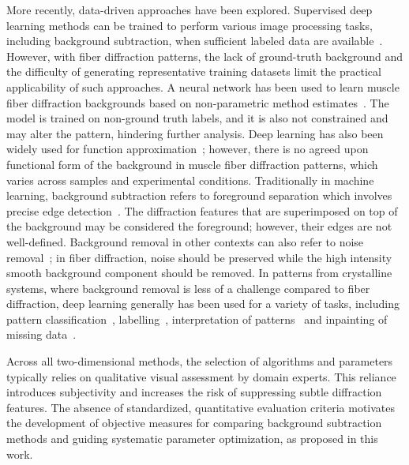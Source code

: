 \documentclass[iucr]{iucrjournals}
\begin{document}
More recently, data-driven approaches have been explored. Supervised deep learning methods can be trained to perform various image processing tasks, including background subtraction, when sufficient labeled data are available~\cite{archana2024dl_image_processing_review}. However, with fiber diffraction patterns, the lack of ground-truth background and the difficulty of generating representative training datasets limit the practical applicability of such approaches. A neural network has been used to learn muscle fiber diffraction backgrounds based on non-parametric method estimates~\cite{ArangurenCarmona2020}. The model is trained on non-ground truth labels, and it is also not constrained and may alter the pattern, hindering further analysis. Deep learning has also been widely used for function approximation~\cite{devore2021nn_approximation}; however, there is no agreed upon functional form of the background in muscle fiber diffraction patterns, which varies across samples and experimental conditions. Traditionally in machine learning, background subtraction refers to foreground separation which involves precise edge detection~\cite{bouwmans2019dnn_background_subtraction}. The diffraction features that are superimposed on top of the background may be considered the foreground; however, their edges are not well-defined. Background removal in other contexts can also refer to noise removal~\cite{jiang2025efficient_denoising_survey}; in fiber diffraction, noise should be preserved while the high intensity smooth background component should be removed.  In patterns from crystalline systems, where background removal is less of a challenge compared to fiber diffraction, deep learning generally has been used for a variety of tasks, including pattern classification~\cite{aguiar2020crystallographic_prediction, ziletti2018dl_crystal_classification}, labelling~\cite{chavez2025mlexchange_labeling}, interpretation of patterns~\cite{szymanski2021probabilistic_multiphase_xrd} and inpainting of missing data~\cite{chavez2022dl_inpainting_xray,roberts2024dlsia}.

Across all two-dimensional methods, the selection of algorithms and parameters typically relies on qualitative visual assessment by domain experts. This reliance introduces subjectivity and increases the risk of suppressing subtle diffraction features. The absence of standardized, quantitative evaluation criteria motivates the development of objective measures for comparing background subtraction methods and guiding systematic parameter optimization, as proposed in this work.
\end{document}
